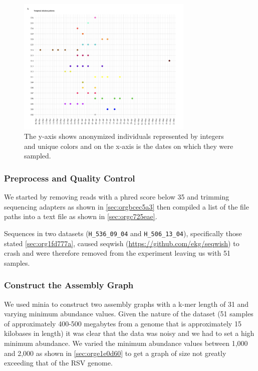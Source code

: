 \documentclass[10pt, a4paper]{article}
\begin{document}
\begin{figure}[h]
\centering
\includegraphics[width=0.75\textwidth]{../Figures/RSV/Githinji_HH_5_temporal_distribution.png}
\caption[Temporal Distribution of RSV Sample Collection]{\label{fig:org9864a9f}
The y-axis shows anonymized individuals represented by integers and unique colors and on the x-axis is the dates on which they were sampled.}
\end{figure}

\subsubsection{Preprocess and Quality Control}
\label{sec:org70665c4}
We started by removing reads with a phred score below 35 and trimming sequencing
adapters as shown in \ref{sec:orgbcec5a3} then compiled a list 
of the file paths into a text file as shown in \ref{sec:orgc725eae}.

Sequences in two datasets (\texttt{H\_536\_09\_04} and \texttt{H\_506\_13\_04}), specifically those 
stated \ref{sec:org1fd777a}, caused seqwish
(\url{https://github.com/ekg/seqwish}) to crash and were therefore removed from the 
experiment leaving us with 51 samples.

\subsubsection{Construct the Assembly Graph}
\label{sec:org2cfdbda}
We used minia \cite{chikhiSpaceefficientExactBruijn2013} to construct two assembly
graphs with a k-mer length of 31 and varying minimum abundance values.
Given the nature of the dataset (51 samples of approximately 400-500 megabytes 
from a genome that is approximately 15 kilobases in length) it was clear 
that the data was noisy and we had to set a high minimum abundance. 
We varied the minimum abundance values between 1,000 and 2,000 as shown 
in \ref{sec:orge1e0d60} to get a graph of size not greatly exceeding that of
the RSV genome.
\end{document}

